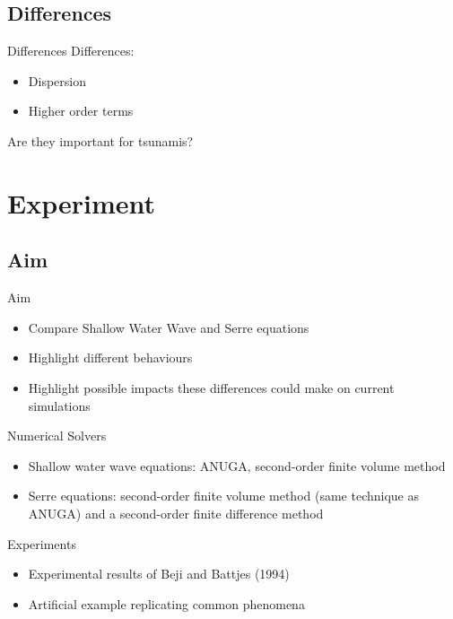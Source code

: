 \documentclass[pdf]{beamer}
\begin{document}
\subsection{Differences}
\begin{frame}{Differences}
	Differences:
	\begin{itemize}
		\item Dispersion
		\item Higher order terms
	\end{itemize}
	Are they important for tsunamis?
\end{frame}


\section{Experiment}
\subsection{Aim}
\begin{frame}{Aim}
	\begin{itemize}
		\item Compare Shallow Water Wave and Serre equations
		\item Highlight different behaviours
		\item Highlight possible impacts these differences could make on current simulations
	\end{itemize}
\end{frame}

\begin{frame}
	Numerical Solvers
	\begin{itemize}
		\item Shallow water wave equations: ANUGA, second-order finite volume method
		\item Serre equations: second-order finite volume method (same technique as ANUGA) and a second-order finite difference method
	\end{itemize}
	\bigskip
	Experiments
	\begin{itemize}
		\item Experimental results of Beji and Battjes (1994)
		\item Artificial example replicating common phenomena
	\end{itemize}
\end{frame}
\end{document}
